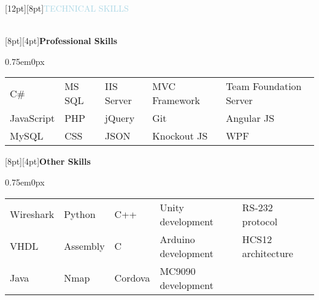 \documentclass{res}
\newenvironment{ResumeBlock}[1]
{
	\begin{normalsize}
		\raisebox{0pt}[12pt][8pt]{\textcolor{lightblue}{#1}}
	\end{normalsize}
	\\
}
{	
}
\newenvironment{DetailsBlockNoSubheader}[1]
{
	\raisebox{0pt}[8pt][4pt]{\textbf{\color{darkfont}#1}}
	\begin{adjustwidth}{0.75em}{0px}
	}
	{	
	\end{adjustwidth}
}
\begin{document}
	\begin{ResumeBlock}{TECHNICAL SKILLS}		
		\begin{DetailsBlockNoSubheader}{Professional Skills}
			\begin{tabular}{ l l l l l }
				C\# & MS SQL & IIS Server & MVC Framework & Team Foundation Server \\ 
				JavaScript & PHP & jQuery & Git & Angular JS \\
				MySQL & CSS & JSON & Knockout JS & WPF \\
			\end{tabular}
		\end{DetailsBlockNoSubheader}
		\begin{DetailsBlockNoSubheader}{Other Skills}	
			\begin{tabular}{ l l l l l }
				Wireshark & Python & C++ & Unity development & RS-232 protocol \\ 
				VHDL & Assembly & C & Arduino development & HCS12 architecture \\ 
				Java & Nmap & Cordova & MC9090 development \\
			\end{tabular}
		\end{DetailsBlockNoSubheader}
	\end{ResumeBlock}
\end{document}

